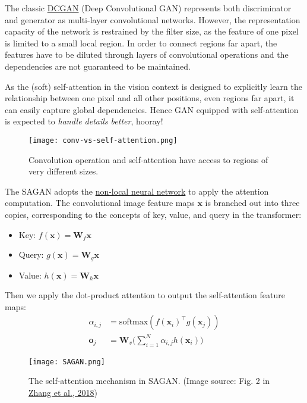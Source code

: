 \documentclass[12pt]{article}
\begin{document}
The classic \href{https://arxiv.org/abs/1511.06434}{DCGAN} (Deep Convolutional GAN) represents both discriminator and generator as multi-layer convolutional networks. However, the representation capacity of the network is restrained by the filter size, as the feature of one pixel is limited to a small local region. In order to connect regions far apart, the features have to be diluted through layers of convolutional operations and the dependencies are not guaranteed to be maintained.

As the (soft) self-attention in the vision context is designed to explicitly learn the relationship between one pixel and all other positions, even regions far apart, it can easily capture global dependencies. Hence GAN equipped with self-attention is expected to \emph{handle details better}, hooray!

\begin{figure}[H]
    \centering
    \texttt{[image: conv-vs-self-attention.png]}
    \caption{Convolution operation and self-attention have access to regions of very different sizes.}
\end{figure}

The SAGAN adopts the \href{https://arxiv.org/pdf/1711.07971.pdf}{non-local neural network} to apply the attention computation. The convolutional image feature maps $\mathbf{x}$ is branched out into three copies, corresponding to the concepts of key, value, and query in the transformer:
\begin{itemize}
    \item Key: $f(\mathbf{x}) = \mathbf{W}_f \mathbf{x}$
    \item Query: $g(\mathbf{x}) = \mathbf{W}_g \mathbf{x}$
    \item Value: $h(\mathbf{x}) = \mathbf{W}_h \mathbf{x}$
\end{itemize}

Then we apply the dot-product attention to output the self-attention feature maps:
\[
\begin{aligned}
\alpha_{i,j} &= \text{softmax}(f(\mathbf{x}_i)^\top g(\mathbf{x}_j)) \\
\mathbf{o}_j &= \mathbf{W}_v \Big( \sum_{i=1}^N \alpha_{i,j} h(\mathbf{x}_i) \Big)
\end{aligned}
\]

\begin{figure}[H]
    \centering
    \texttt{[image: SAGAN.png]}
    \caption{The self-attention mechanism in SAGAN. (Image source: Fig. 2 in \href{https://arxiv.org/abs/1805.08318}{Zhang et al., 2018})}
\end{figure}
\end{document}
